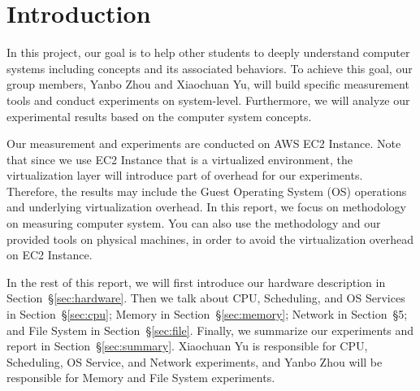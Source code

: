\section{Introduction}
\label{sec:intro}
In this project, our goal is to help other students to deeply understand computer systems including concepts and its associated behaviors. To achieve this goal, our group members, Yanbo Zhou and Xiaochuan Yu, will build specific measurement tools and conduct experiments on system-level. Furthermore, we will analyze our experimental results based on the computer system concepts.

Our measurement and experiments are conducted on AWS EC2 Instance. Note that since we use EC2 Instance that is a virtualized environment, the virtualization layer will introduce part of overhead for our experiments. Therefore, the results may include the Guest Operating System (OS) operations and underlying virtualization overhead. In this report, we focus on methodology on measuring computer system. You can also use the methodology and our provided tools on physical machines, in order to avoid the virtualization overhead on EC2 Instance.

In the rest of this report, we will first introduce our hardware description in Section~{\S\ref{sec:hardware}}. Then we talk about CPU, Scheduling, and OS Services in Section~{\S\ref{sec:cpu}}; Memory in Section~{\S\ref{sec:memory}}; Network in Section~{\S5}; and File System in Section~{\S\ref{sec:file}}. Finally, we summarize our experiments and report in Section~{\S\ref{sec:summary}}. Xiaochuan Yu is responsible for CPU, Scheduling, OS Service, and Network experiments, and Yanbo Zhou will be responsible for Memory and File System experiments.
